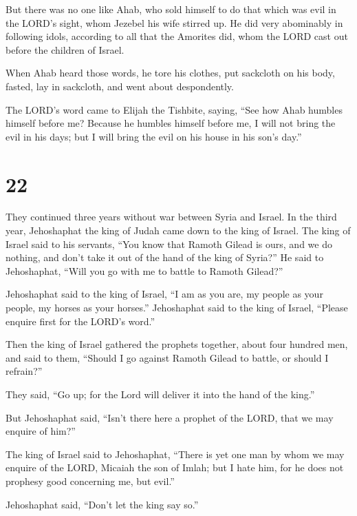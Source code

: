  But there was no one like Ahab, who sold himself to do
that which was evil in the LORD's sight, whom Jezebel his wife stirred
up.  He did very abominably in following idols, according
to all that the Amorites did, whom the LORD cast out before the children
of Israel.

 When Ahab heard those words, he tore his clothes, put
sackcloth on his body, fasted, lay in sackcloth, and went about
despondently.

 The LORD's word came to Elijah the Tishbite, saying,
 ``See how Ahab humbles himself before me? Because he
humbles himself before me, I will not bring the evil in his days; but I
will bring the evil on his house in his son's day.''

\hypertarget{section-21}{%
\section{22}\label{section-21}}

 They continued three years without war between Syria and
Israel.  In the third year, Jehoshaphat the king of Judah
came down to the king of Israel.  The king of Israel said to
his servants, ``You know that Ramoth Gilead is ours, and we do nothing,
and don't take it out of the hand of the king of Syria?'' 
He said to Jehoshaphat, ``Will you go with me to battle to Ramoth
Gilead?''

Jehoshaphat said to the king of Israel, ``I am as you are, my people as
your people, my horses as your horses.''  Jehoshaphat said
to the king of Israel, ``Please enquire first for the LORD's word.''

 Then the king of Israel gathered the prophets together,
about four hundred men, and said to them, ``Should I go against Ramoth
Gilead to battle, or should I refrain?''

They said, ``Go up; for the Lord will deliver it into the hand of the
king.''

 But Jehoshaphat said, ``Isn't there here a prophet of the
LORD, that we may enquire of him?''

 The king of Israel said to Jehoshaphat, ``There is yet one
man by whom we may enquire of the LORD, Micaiah the son of Imlah; but I
hate him, for he does not prophesy good concerning me, but evil.''

Jehoshaphat said, ``Don't let the king say so.''


